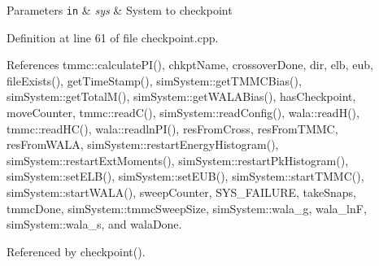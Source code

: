 \begin{DoxyParams}[1]{Parameters}
\mbox{\tt in}  & {\em sys} & System to checkpoint \\
\hline
\end{DoxyParams}


Definition at line 61 of file checkpoint.\-cpp.



References tmmc\-::calculate\-P\-I(), chkpt\-Name, crossover\-Done, dir, elb, eub, file\-Exists(), get\-Time\-Stamp(), sim\-System\-::get\-T\-M\-M\-C\-Bias(), sim\-System\-::get\-Total\-M(), sim\-System\-::get\-W\-A\-L\-A\-Bias(), has\-Checkpoint, move\-Counter, tmmc\-::read\-C(), sim\-System\-::read\-Config(), wala\-::read\-H(), tmmc\-::read\-H\-C(), wala\-::readln\-P\-I(), res\-From\-Cross, res\-From\-T\-M\-M\-C, res\-From\-W\-A\-L\-A, sim\-System\-::restart\-Energy\-Histogram(), sim\-System\-::restart\-Ext\-Moments(), sim\-System\-::restart\-Pk\-Histogram(), sim\-System\-::set\-E\-L\-B(), sim\-System\-::set\-E\-U\-B(), sim\-System\-::start\-T\-M\-M\-C(), sim\-System\-::start\-W\-A\-L\-A(), sweep\-Counter, S\-Y\-S\-\_\-\-F\-A\-I\-L\-U\-R\-E, take\-Snaps, tmmc\-Done, sim\-System\-::tmmc\-Sweep\-Size, sim\-System\-::wala\-\_\-g, wala\-\_\-ln\-F, sim\-System\-::wala\-\_\-s, and wala\-Done.



Referenced by checkpoint().



